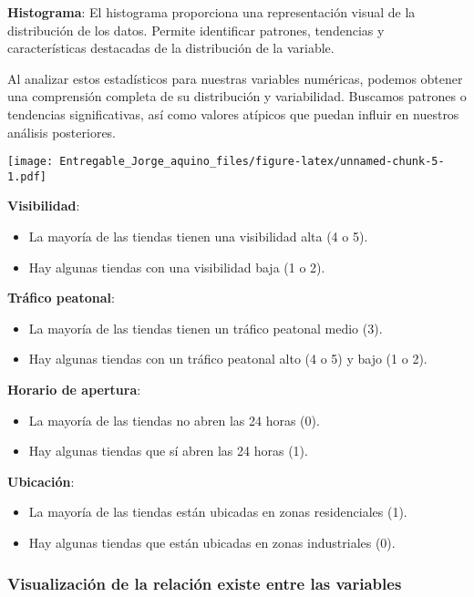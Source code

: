 \documentclass[
]{article}
\providecommand{\tightlist}{%
  \setlength{\itemsep}{0pt}\setlength{\parskip}{0pt}}
\begin{document}
\textbf{Histograma}: El histograma proporciona una representación visual
de la distribución de los datos. Permite identificar patrones,
tendencias y características destacadas de la distribución de la
variable.

Al analizar estos estadísticos para nuestras variables numéricas,
podemos obtener una comprensión completa de su distribución y
variabilidad. Buscamos patrones o tendencias significativas, así como
valores atípicos que puedan influir en nuestros análisis posteriores.

\texttt{[image: Entregable\_Jorge\_aquino\_files/figure-latex/unnamed-chunk-5-1.pdf]}

\textbf{Visibilidad}:

\begin{itemize}
\tightlist
\item
  La mayoría de las tiendas tienen una visibilidad alta (4 o 5).
\item
  Hay algunas tiendas con una visibilidad baja (1 o 2).
\end{itemize}

\textbf{Tráfico peatonal}:

\begin{itemize}
\tightlist
\item
  La mayoría de las tiendas tienen un tráfico peatonal medio (3).
\item
  Hay algunas tiendas con un tráfico peatonal alto (4 o 5) y bajo (1 o
  2).
\end{itemize}

\textbf{Horario de apertura}:

\begin{itemize}
\tightlist
\item
  La mayoría de las tiendas no abren las 24 horas (0).
\item
  Hay algunas tiendas que sí abren las 24 horas (1).
\end{itemize}

\textbf{Ubicación}:

\begin{itemize}
\tightlist
\item
  La mayoría de las tiendas están ubicadas en zonas residenciales (1).
\item
  Hay algunas tiendas que están ubicadas en zonas industriales (0).
\end{itemize}

\hypertarget{visualizaciuxf3n-de-la-relaciuxf3n-existe-entre-las-variables}{%
\subsubsection{Visualización de la relación existe entre las
variables}\label{visualizaciuxf3n-de-la-relaciuxf3n-existe-entre-las-variables}}
\end{document}
